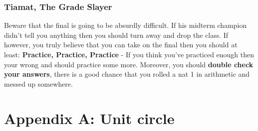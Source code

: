 \documentclass[letterpaper,10pt,twoside,twocolumn,openany]{book}
\begin{document}
\subsection{Tiamat, The Grade Slayer}
Beware that the final is going to be absurdly difficult. If his midterm champion didn't tell you anything then you should turn away and drop the class. If however, you truly believe that you can take on the final then you should at least: \textbf{Practice, Practice, Practice} - If you think you've practiced enough then your wrong and should practice some more. Moreover, you should \textbf{double check your answers}, there is a good chance that you rolled a nat 1 in arithmetic and messed up somewhere.


\onecolumn
\appendix 
\chapter*{Appendix A: Unit circle}
\end{document}
